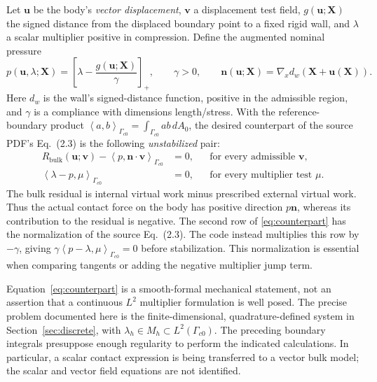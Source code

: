 \documentclass[preprint,11pt]{elsarticle}
\numberwithin{equation}{section}
\newcommand{\bu}{\boldsymbol{u}}
\newcommand{\bv}{\boldsymbol{v}}
\newcommand{\bX}{\boldsymbol{X}}
\newcommand{\bn}{\boldsymbol{n}}
\newcommand{\Gc}{\Gamma_{c0}}
\newcommand{\ip}[2]{\left\langle #1,#2\right\rangle_{\Gc}}
\newcommand{\pos}[1]{\left[#1\right]_+}
\newcommand{\Rbulk}{R_{\mathrm{bulk}}}
\begin{document}
Let $\bu$ be the body's \emph{vector displacement}, $\bv$ a displacement
test field, $g(\bu;\bX)$ the signed distance from the displaced boundary
point to a fixed rigid wall, and $\lambda$ a scalar multiplier positive
in compression. Define the augmented nominal pressure
\begin{equation}
 p(\bu,\lambda;\bX)=\pos{\lambda-\frac{g(\bu;\bX)}{\gamma}},
 \qquad \gamma>0,
 \qquad \bn(\bu;\bX)=\nabla_x d_w(\bX+\bu(\bX)).
 \label{eq:pressure}
\end{equation}
Here $d_w$ is the wall's signed-distance function, positive in the admissible
region, and $\gamma$ is a compliance with dimensions length/stress.
With the reference-boundary product
$\ip{a}{b}=\int_{\Gc}ab\,dA_0$, the desired counterpart of the
source PDF's Eq.~(2.3) is the following \emph{unstabilized} pair:
\begin{equation}
 \boxed{\begin{aligned}
  \Rbulk(\bu;\bv)-\ip{p}{\bn\cdot\bv}&=0,
       &&\text{for every admissible }\bv,\\
  \ip{\lambda-p}{\mu}&=0,
       &&\text{for every multiplier test }\mu.
 \end{aligned}}
 \label{eq:counterpart}
\end{equation}
The bulk residual is internal virtual work minus prescribed external
virtual work. Thus the actual contact force on the body has positive
direction $p\bn$, whereas its contribution to the residual is negative.
The second row of \eqref{eq:counterpart} has the normalization of the
source Eq.~(2.3). The code instead multiplies this row by $-\gamma$,
giving $\gamma\ip{p-\lambda}{\mu}=0$ before stabilization.
This normalization is essential when comparing tangents or adding the
negative multiplier jump term.

Equation~\eqref{eq:counterpart} is a smooth-formal mechanical statement,
not an assertion that a continuous $L^2$ multiplier formulation is
well posed. The precise problem documented here is the finite-dimensional,
quadrature-defined system in Section~\ref{sec:discrete}, with
$\lambda_h\in M_h\subset L^2(\Gc)$. The preceding boundary integrals
presuppose enough regularity to perform the indicated calculations.
In particular, a scalar contact expression is being transferred to a
vector bulk model; the scalar and vector field equations are not identified.
\end{document}
